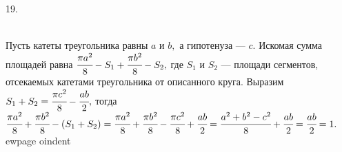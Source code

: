 19. \begin{figure}[ht!]
\end{figure}\\
Пусть катеты треугольника равны $a$ и $b,$ а гипотенуза --- $c.$ Искомая сумма площадей равна $\cfrac{\pi a^2}{8}-S_1+\cfrac{\pi b^2}{8}-S_2,$ где $S_1$ и $S_2$ --- площади сегментов, отсекаемых катетами треугольника от описанного круга. Выразим $S_1+S_2=\cfrac{\pi c^2}{8}-\cfrac{ab}{2},$ тогда
$\cfrac{\pi a^2}{8}+\cfrac{\pi b^2}{8}-(S_1+S_2)=\cfrac{\pi a^2}{8}+\cfrac{\pi b^2}{8}-\cfrac{\pi c^2}{8}+\cfrac{ab}{2}=\cfrac{a^2+b^2-c^2}{8}+\cfrac{ab}{2}=
\cfrac{ab}{2}=1.$
ewpage
oindent
